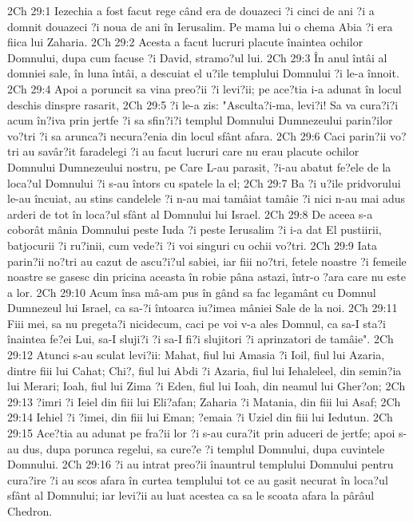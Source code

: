 2Ch 29:1  Iezechia a fost facut rege când era de douazeci ?i cinci de ani ?i a domnit douazeci ?i noua de ani în Ierusalim. Pe mama lui o chema Abia ?i era fiica lui Zaharia.
2Ch 29:2  Acesta a facut lucruri placute înaintea ochilor Domnului, dupa cum facuse ?i David, stramo?ul lui.
2Ch 29:3  În anul întâi al domniei sale, în luna întâi, a descuiat el u?ile templului Domnului ?i le-a înnoit.
2Ch 29:4  Apoi a poruncit sa vina preo?ii ?i levi?ii; pe ace?tia i-a adunat în locul deschis dinspre rasarit,
2Ch 29:5  ?i le-a zis: "Asculta?i-ma, levi?i! Sa va cura?i?i acum în?iva prin jertfe ?i sa sfin?i?i templul Domnului Dumnezeului parin?ilor vo?tri ?i sa arunca?i necura?enia din locul sfânt afara.
2Ch 29:6  Caci parin?ii vo?tri au savâr?it faradelegi ?i au facut lucruri care nu erau placute ochilor Domnului Dumnezeului nostru, pe Care L-au parasit, ?i-au abatut fe?ele de la loca?ul Domnului ?i s-au întors cu spatele la el;
2Ch 29:7  Ba ?i u?ile pridvorului le-au încuiat, au stins candelele ?i n-au mai tamâiat tamâie ?i nici n-au mai adus arderi de tot în loca?ul sfânt al Domnului lui Israel.
2Ch 29:8  De aceea s-a coborât mânia Domnului peste Iuda ?i peste Ierusalim ?i i-a dat El pustiirii, batjocurii ?i ru?inii, cum vede?i ?i voi singuri cu ochii vo?tri.
2Ch 29:9  Iata parin?ii no?tri au cazut de ascu?i?ul sabiei, iar fiii no?tri, fetele noastre ?i femeile noastre se gasesc din pricina aceasta în robie pâna astazi, într-o ?ara care nu este a lor.
2Ch 29:10  Acum însa mâ-am pus în gând sa fac legamânt cu Domnul Dumnezeul lui Israel, ca sa-?i întoarca iu?imea mâniei Sale de la noi.
2Ch 29:11  Fiii mei, sa nu pregeta?i nicidecum, caci pe voi v-a ales Domnul, ca sa-I sta?i înaintea fe?ei Lui, sa-I sluji?i ?i sa-I fi?i slujitori ?i aprinzatori de tamâie".
2Ch 29:12  Atunci s-au sculat levi?ii: Mahat, fiul lui Amasia ?i Ioil, fiul lui Azaria, dintre fiii lui Cahat; Chi?, fiul lui Abdi ?i Azaria, fiul lui Iehaleleel, din semin?ia lui Merari; Ioah, fiul lui Zima ?i Eden, fiul lui Ioah, din neamul lui Gher?on;
2Ch 29:13  ?imri ?i Ieiel din fiii lui Eli?afan; Zaharia ?i Matania, din fiii lui Asaf;
2Ch 29:14  Iehiel ?i ?imei, din fiii lui Eman; ?emaia ?i Uziel din fiii lui Iedutun.
2Ch 29:15  Ace?tia au adunat pe fra?ii lor ?i s-au cura?it prin aduceri de jertfe; apoi s-au dus, dupa porunca regelui, sa cure?e ?i templul Domnului, dupa cuvintele Domnului.
2Ch 29:16  ?i au intrat preo?ii înauntrul templului Domnului pentru cura?ire ?i au scos afara în curtea templului tot ce au gasit necurat în loca?ul sfânt al Domnului; iar levi?ii au luat acestea ca sa le scoata afara la pârâul Chedron.

